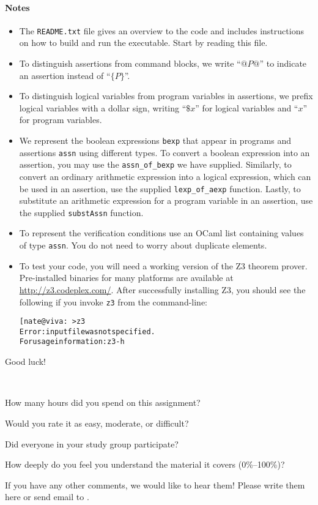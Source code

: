 \documentclass[11pt]{article}
\begin{document}
\paragraph{Notes}
%
\begin{itemize}
\item The \texttt{README.txt} file gives an overview to the code and
  includes instructions on how to build and run the executable. Start
  by reading this file.
\item To distinguish assertions from command blocks, we write
  ``$\texttt{@} P \texttt{@}$'' to indicate an assertion instead of
  ``$\texttt{\{} P \texttt{\}}$''.
\item To distinguish logical variables from program variables in
  assertions, we prefix logical variables with a dollar sign, writing
  ``$\texttt{\$}x$'' for logical variables and ``$x$'' for program
  variables.
\item We represent the boolean expressions \texttt{bexp} that appear
  in programs and assertions \texttt{assn} using different types. To
  convert a boolean expression into an assertion, you may use the
  \texttt{assn\_of\_bexp} we have supplied. Similarly, to convert an
  ordinary arithmetic expression into a logical expression, which can
  be used in an assertion, use the supplied \texttt{lexp\_of\_aexp}
  function. Lastly, to substitute an arithmetic expression for a
  program variable in an assertion, use the supplied
  \texttt{substAssn} function.
\item To represent the verification conditions use an OCaml list
  containing values of type \texttt{assn}. You do not need to worry
  about duplicate elements.

\item To test your code, you will need a working version of the Z3
  theorem prover. Pre-installed binaries for many platforms are
  available at \url{http://z3.codeplex.com/}. After successfully
  installing Z3, you should see the following if you invoke
  \texttt{z3} from the command-line:
\begin{alltt}
[nate@viva:~> z3
Error: input file was not specified.
For usage information: z3 -h
\end{alltt}
\end{itemize}

Good luck!

\begin{debriefing} \hfill\\[-4ex]
\begin{enumerate*}
\item How many hours did you spend on this assignment? 
\item Would you rate it as easy, moderate, or difficult? 
\item Did everyone in your study group participate? 
\item How deeply do you feel you understand the material it covers (0\%--100\%)? 
\item If you have any other comments, we would like to hear them!
  Please write them here or send email to
  .
\end{enumerate*}
\end{debriefing}
\end{document}
